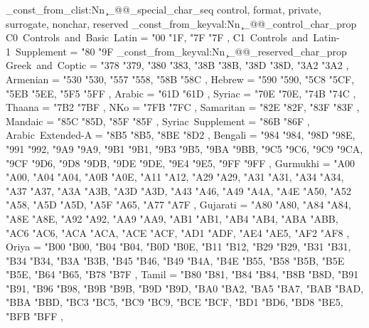 \seq_const_from_clist:Nn \c_@@_special_char_seq
  { control, format, private, surrogate, nonchar, reserved }
\prop_const_from_keyval:Nn \c_@@_control_char_prop
  {
    C0~Controls~and~Basic~Latin        = { {"00} {"1F}, {"7F} {"7F} },
    C1~Controls~and~Latin-1~Supplement = { {"80} {"9F} }
  }
\prop_const_from_keyval:Nn \c_@@_reserved_char_prop
  {
    Greek~and~Coptic                               = { {"378} {"379}, {"380} {"383}, {"38B} {"38B}, {"38D} {"38D}, {"3A2} {"3A2} },
    Armenian                                       = { {"530} {"530}, {"557} {"558}, {"58B} {"58C} },
    Hebrew                                         = { {"590} {"590}, {"5C8} {"5CF}, {"5EB} {"5EE}, {"5F5} {"5FF} },
    Arabic                                         = { {"61D} {"61D} },
    Syriac                                         = { {"70E} {"70E}, {"74B} {"74C} },
    Thaana                                         = { {"7B2} {"7BF} },
    NKo                                            = { {"7FB} {"7FC} },
    Samaritan                                      = { {"82E} {"82F}, {"83F} {"83F} },
    Mandaic                                        = { {"85C} {"85D}, {"85F} {"85F} },
    Syriac~Supplement                              = { {"86B} {"86F} },
    Arabic~Extended-A                              = { {"8B5} {"8B5}, {"8BE} {"8D2} },
    Bengali                                        = { {"984} {"984}, {"98D} {"98E}, {"991} {"992}, {"9A9} {"9A9}, {"9B1} {"9B1}, {"9B3} {"9B5}, {"9BA} {"9BB}, {"9C5} {"9C6}, {"9C9} {"9CA}, {"9CF} {"9D6}, {"9D8} {"9DB}, {"9DE} {"9DE}, {"9E4} {"9E5}, {"9FF} {"9FF} },
    Gurmukhi                                       = { {"A00} {"A00}, {"A04} {"A04}, {"A0B} {"A0E}, {"A11} {"A12}, {"A29} {"A29}, {"A31} {"A31}, {"A34} {"A34}, {"A37} {"A37}, {"A3A} {"A3B}, {"A3D} {"A3D}, {"A43} {"A46}, {"A49} {"A4A}, {"A4E} {"A50}, {"A52} {"A58}, {"A5D} {"A5D}, {"A5F} {"A65}, {"A77} {"A7F} },
    Gujarati                                       = { {"A80} {"A80}, {"A84} {"A84}, {"A8E} {"A8E}, {"A92} {"A92}, {"AA9} {"AA9}, {"AB1} {"AB1}, {"AB4} {"AB4}, {"ABA} {"ABB}, {"AC6} {"AC6}, {"ACA} {"ACA}, {"ACE} {"ACF}, {"AD1} {"ADF}, {"AE4} {"AE5}, {"AF2} {"AF8} },
    Oriya                                          = { {"B00} {"B00}, {"B04} {"B04}, {"B0D} {"B0E}, {"B11} {"B12}, {"B29} {"B29}, {"B31} {"B31}, {"B34} {"B34}, {"B3A} {"B3B}, {"B45} {"B46}, {"B49} {"B4A}, {"B4E} {"B55}, {"B58} {"B5B}, {"B5E} {"B5E}, {"B64} {"B65}, {"B78} {"B7F} },
    Tamil                                          = { {"B80} {"B81}, {"B84} {"B84}, {"B8B} {"B8D}, {"B91} {"B91}, {"B96} {"B98}, {"B9B} {"B9B}, {"B9D} {"B9D}, {"BA0} {"BA2}, {"BA5} {"BA7}, {"BAB} {"BAD}, {"BBA} {"BBD}, {"BC3} {"BC5}, {"BC9} {"BC9}, {"BCE} {"BCF}, {"BD1} {"BD6}, {"BD8} {"BE5}, {"BFB} {"BFF} },
}
